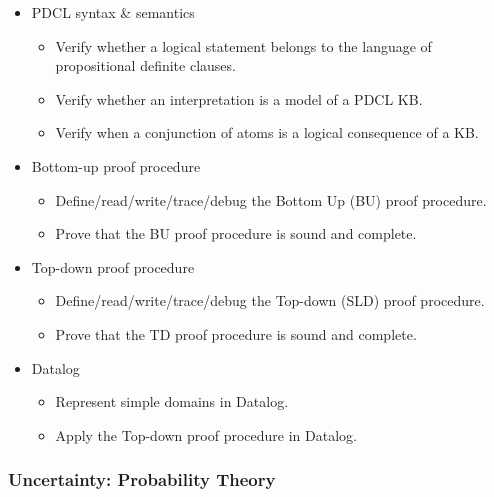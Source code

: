 \documentclass{article}
\begin{document}
\begin{itemize}
    \item PDCL syntax \& semantics
        \begin{itemize}
            \item Verify whether a logical statement belongs to the language of propositional definite clauses.
            \item Verify whether an interpretation is a model of a PDCL KB.
            \item Verify when a conjunction of atoms is a logical consequence of a KB.
        \end{itemize}
    \item Bottom-up proof procedure
        \begin{itemize}
            \item Define/read/write/trace/debug the Bottom Up (BU) proof procedure.
            \item Prove that the BU proof procedure is sound and complete.
        \end{itemize}
    \item Top-down proof procedure
        \begin{itemize}
            \item Define/read/write/trace/debug the Top-down (SLD) proof procedure.
            \item Prove that the TD proof procedure is sound and complete.
        \end{itemize}
    \item Datalog
        \begin{itemize}
            \item Represent simple domains in Datalog.
            \item Apply the Top-down proof procedure in Datalog.
        \end{itemize}
\end{itemize}

\subsubsection*{Uncertainty: Probability Theory}
\end{document}
